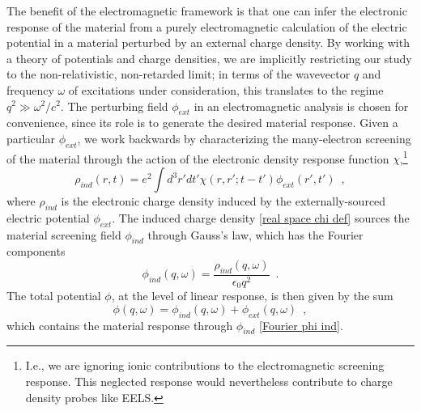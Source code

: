 \documentclass{article}
\newcommand{\e}{\epsilon}
\begin{document}
The benefit of the electromagnetic framework is that one can infer the electronic response of the material from a purely electromagnetic calculation of the electric potential in a material perturbed by an external charge density.  By working with a theory of potentials and charge densities, we are implicitly restricting our study to the non-relativistic, non-retarded limit; in terms of the wavevector $q$ and frequency $\omega$ of excitations under consideration, this translates to the regime $q^2\gg \omega^2/c^2$.  The perturbing field $\phi_{ext}$ in an electromagnetic analysis is chosen for convenience, since its role is to generate the desired material response.  Given a particular $\phi_{ext}$, we work backwards by characterizing the many-electron screening of the material through the action of the electronic density response function $\chi$,\footnote{I.e., we are ignoring ionic contributions to the electromagnetic screening response.  This neglected response would nevertheless contribute to charge density probes like EELS.}
\begin{equation}
    \label{real space chi def}
    \rho_{ind}(r,t) = e^2\int d^3 r' dt' \chi(r,r';t-t')\phi_{ext}(r',t')
    \,\,\,,
\end{equation}
where $\rho_{ind}$ is the electronic charge density induced by the externally-sourced electric potential $\phi_{ext}$.  The induced charge density \eqref{real space chi def} sources the material screening field $\phi_{ind}$ through Gauss's law, which has the Fourier components
\begin{equation}
    \label{Fourier phi ind}
    \phi_{ind}(q,\omega) = \frac{\rho_{ind}(q,\omega)}{\e_0 q^2}
    \,\,\,.
\end{equation}
The total potential $\phi$, at the level of linear response, is then given by the sum
\begin{equation}
    \label{phi def}
    \phi(q,\omega) = \phi_{ind}(q,\omega) + \phi_{ext}(q,\omega)
    \,\,\,,
\end{equation}
which contains the material response through $\phi_{ind}$ \eqref{Fourier phi ind}.  
\end{document}
